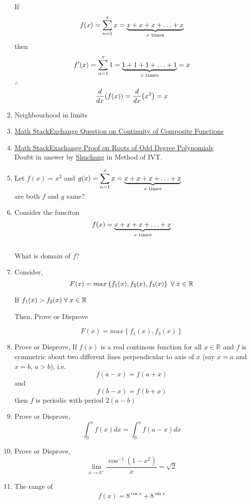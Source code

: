 \documentclass{article}
\begin{document}
\begin{enumerate}
            If $$f(x)=\displaystyle\sum_{n=1}^{x} x=\underbrace{x+x+x+\ldots +x}_{x \hspace{1mm} \text{times}}$$
            then $$f'(x)=\displaystyle\sum_{n=1}^{x} 1=\underbrace{1+1+1+\ldots+1}_{x \hspace{1mm} \text{times}}=x$$
            $\therefore$ $$\dv{x}(f(x))=\dv{x}(x^2)=x$$
      \item Neighbourhood in limits
      \item \href{https://math.stackexchange.com/questions/4892287/is-this-result-on-continuity-of-composite-functions-true}{Math StackExchange Question on Continuity of Composite Functions}
      \item \href{https://math.stackexchange.com/questions/689575/proof-that-every-polynomial-of-odd-degree-has-one-real-root}{Math StackExachange Proof on Roots of Odd Degree Polynomials } \\ Doubt in answer by  \href{https://math.stackexchange.com/users/91982/shuchang}{Shuchang} in Method of IVT.
      \item Let $f(x)=x^2$ and $g(x)=\displaystyle\sum_{n=1}^{x}x=\underbrace{x+x+x+\ldots +x}_{x \hspace{1mm} \text{times}}$
            \\ are both $f$ and $g$ same?
      \item Consider the funciton $$f(x)=\underbrace{x+x+x+\ldots+x}_{x \hspace{1mm} \text{times}}$$ \\
            What is domain of $f$?
      \item Consider, $$F(x)=max\left\{f_{1}(x),f_{2}(x),f_{3}(x)\right\} \hspace{1mm} \forall \hspace{1mm} x \in \mathbb{R}$$

            If $f_{1}(x) > f_{2}(x) \hspace{1mm} \forall \hspace{1mm} x \in \mathbb{R}$

            Then, Prove or Disprove

            $$F(x)=max\left\{f_{1}(x),f_{3}(x)\right\}$$
      \item Prove or Disprove,
            If $f(x)$ is a real continous function for all $x \in \mathbb{R}$ and $f$ is symmetric about two different lines perpendicular to axis of $x$ (say $x=a$ and $x=b$, $a>b$), i.e. $$f(a-x)=f(a+x) $$ and $$f(b-x)=f(b+x)$$ then $f$ is periodic with period $2(a-b)$
      \item Prove or Disprove,
            $$\displaystyle\int_{0}^{a} f(x) dx=\displaystyle\int_{0}^{a} f(a-x) dx$$
      \item Prove or Disprove, 
      $$\lim\limits_{x \to 0^+}{\dfrac{\cos^{-1} \left(1-x^2\right)}{x}}=\sqrt{2}$$
      \item The range of $$f(x)=8^{\cos x}+8^{\sin x}$$
\end{enumerate}
\end{document}

